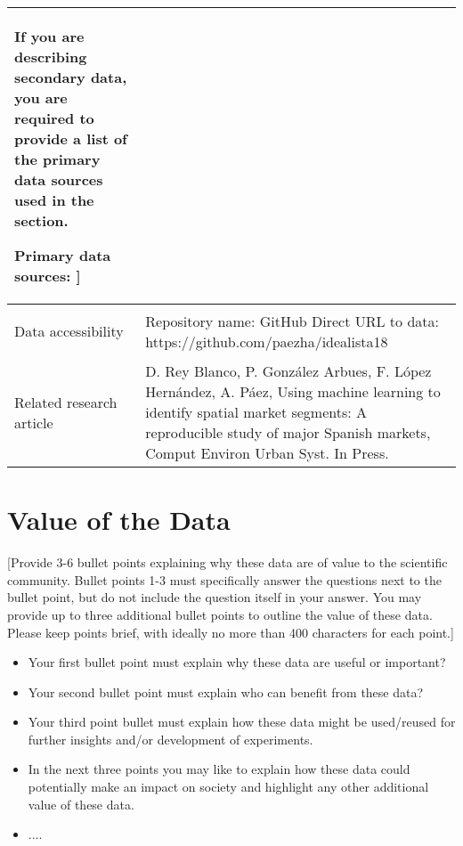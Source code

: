 \documentclass[times,final]{elsarticle}
\begin{document}
{\begin{longtable}{|p{33mm}|p{94mm}|}
                         If you are describing secondary data, you are required to provide a list of
                         the primary data sources used in the section.\newline

                         Primary data sources:  ]\\
\hline
\hypertarget{target1}
{Data accessibility}   & Repository name: GitHub\newline
                         Direct URL to data: https://github.com/paezha/idealista18\newline
                         \\
\hline
Related
research\newline
article                & D. Rey Blanco, P. González Arbues, F. López Hernández, A. Páez, Using machine learning to identify spatial market segments: A reproducible study of major Spanish markets, Comput Environ Urban Syst. In Press.\newline
\end{longtable}
}

\section*{Value of the Data}

[Provide 3-6 bullet points explaining why these data are of value to the scientific community.
Bullet points 1-3 must specifically answer the questions next to the bullet point,
but do not include the question itself in your answer. You may
provide up to three additional bullet points to outline the value of these data.
Please keep points brief, with ideally no more than 400 characters for each point.]

\begin{itemize}
\itemsep=0pt
\parsep=0pt
\item Your first bullet point must explain why these data are useful or important?
\item Your second bullet point must explain who can benefit from these data?
\item Your third point bullet must explain how these data might be used/reused for
further insights and/or development of experiments.
\item In the next three points you may like to explain how these data could
potentially make an impact on society and highlight any other additional value of these data.
\item ....
\end{itemize}
\end{document}

